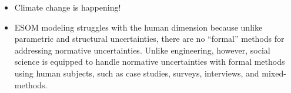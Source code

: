 \begin{frame}
\begin{columns}
        \begin{itemize}
            \item Climate change is happening!
            \item ESOM modeling struggles with the human dimension \cite{pfenninger_energy_2014} because
            unlike parametric and structural uncertainties, there are no ``formal'' methods for addressing
            normative uncertainties. Unlike engineering, however, social science is equipped to handle 
            normative uncertainties with formal methods using human subjects, such as case studies, surveys,
            interviews, and mixed-methods.
        \end{itemize}

        
    \end{columns}

\end{frame}